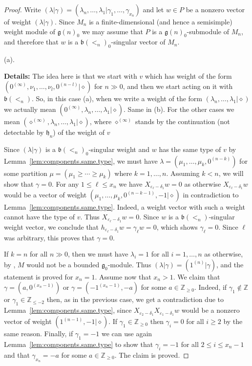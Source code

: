\documentclass[12pt]{amsart}
\newcommand\Z{\mathbb{Z}}
\newcommand\g{\mathfrak{g}}
\newcommand\fh{\mathfrak{h}}
\newcommand\fb{\mathfrak{b}}
\theoremstyle{plain}
\theoremstyle{definition}
\numberwithin{equation}{section}
\newcommand{\details}[1]{\smallskip \color{blue} \begin{footnotesize} \textbf{Details:} #1 \end{footnotesize} \color{black}}
\newcommand{\details}[1]{}
\begin{document}
\begin{proof}
Write $(\lambda|\gamma) = (\lambda_n, \ldots, \lambda_1 | \gamma_1,\ldots, \gamma_{x_n})$ and let $w\in P$ be a nonzero vector of weight $(\lambda | \gamma)$. Since $M_n$ is a finite-dimensional (and hence a semisimple) weight module of $\g(n)_0$ we may assume that $P$ is a $\g(n)_0$-submodule of $M_n$, and therefore that $w$ is a $\fb(<_n)_0$-singular vector of $M_n$.


(a).\details{The idea here is that we start with $v$ which has weight of the form $(0^{(\infty)},\nu_1,\ldots, \nu_l,0^{(n-l)}|\diamond)$ for $n\gg0$, and then we start acting on it with $\fb(<_n)$. So, in this case (a), when we write a weight of the form $(\lambda_n, \ldots, \lambda_1 | \diamond)$ we actually mean $(0^{(\infty)},\lambda_n, \ldots, \lambda_1 | \diamond)$. Same in (b). For the other cases we mean $(\diamond^{(\infty)},\lambda_n, \ldots, \lambda_1 | \diamond)$, where $\diamond^{(\infty)}$ stands by the continuation (not detectable by $\fh_n$) of the weight of $v$} Since $(\lambda|\gamma)$ is a $\fb(<_n)_0$-singular weight and $w$ has the same type of $v$ by Lemma~\ref{lem:components.same.type}, we must have $\lambda = (\mu_1,\ldots,\mu_k,0^{(n-k)})$ for some partition $\mu = (\mu_1\geq \cdots \geq \mu_k)$ where $k=1,\ldots, n$. Assuming $k<n$, we will show that $\gamma = 0$. For any $1\leq \ell\leq x_n$ we have $X_{\varepsilon_\ell - \delta_1}w=0$ as otherwise $X_{\varepsilon_\ell - \delta_1}w$ would be a vector of weight $(\mu_1,\ldots,\mu_k,0^{(n-k-1)},-1|\diamond)$ in contradiction to Lemma~\ref{lem:components.same.type}. Indeed, a weight vector with such a weight cannot have the type of $v$. Thus $X_{\varepsilon_\ell - \delta_1}w=0$. Since $w$ is a $\fb(<_n)$-singular weight vector, we conclude that $h_{\varepsilon_\ell - \delta_1}w=\gamma_\ell w = 0$, which shows $\gamma_\ell=0$. Since $\ell$ was arbitrary, this proves that $\gamma=0$.

If $k=n$ for all $n\gg 0$, then we must have $\lambda_i=1$ for all $i=1,\ldots, n$ as otherwise, by \cite[Theorem~5.1]{GP20}, $M$ would not be a bounded $\g_0$-module. Thus $(\lambda | \gamma) = (1^{(n)}|\gamma)$, and the statement is proved for $x_n=1$. Assume now that $x_n>1$. We claim that $\gamma=(a, 0^{(x_n-1)})$ or $\gamma=(-1^{(x_n-1)}, -a)$ for some $a\in \Z_{\geq 0}$. Indeed, if $\gamma_1\notin \Z$ or $\gamma_1\in \Z_{\leq -2}$ then, as in the previous case, we get a contradiction due to Lemma~\ref{lem:components.same.type}, since $X_{\varepsilon_2 - \delta_1} X_{\varepsilon_1 - \delta_1}w$ would be a nonzero vector of weight $(1^{(n-1)}, -1|\diamond)$. If $\gamma_1 \in \Z_{\geq 0}$ then $\gamma_i = 0$ for all $i\geq 2$ by the same reason. Finally, if $\gamma_1 = -1$ we can use again  Lemma~\ref{lem:components.same.type} to show that $\gamma_i = -1$ for all $2\leq i\leq x_n-1$ and that $\gamma_{x_n}=-a$ for some $a\in \Z_{\geq 0}$. The claim is proved. 


\end{proof}
\end{document}
